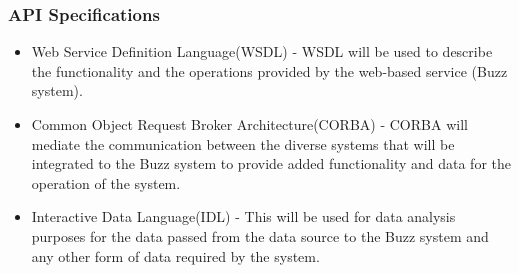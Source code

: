 \subsubsection{API Specifications}
\begin{itemize}
\item Web Service Definition Language(WSDL) - WSDL will be used to describe the functionality and the operations provided by the web-based service (Buzz system).
\item Common Object Request Broker Architecture(CORBA) - CORBA will mediate the communication between the diverse systems that will be integrated to the Buzz system to provide added functionality and data for the operation of the system.
\item Interactive Data Language(IDL) - This will be used for data analysis purposes for the data passed from the data source to the Buzz system and any other form of data required by the system.
\end{itemize}
%